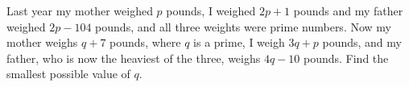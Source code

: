 Last year my mother weighed $p$ pounds, I weighed $2p+1$ pounds and my father weighed $2p-104$ pounds, and all three weights were prime numbers. Now my mother weighs $q+7$ pounds, where $q$ is a prime, I weigh $3q+p$ pounds, and my father, who is now the heaviest of the three, weighs $4q-10$ pounds. Find the smallest possible value of $q$.
